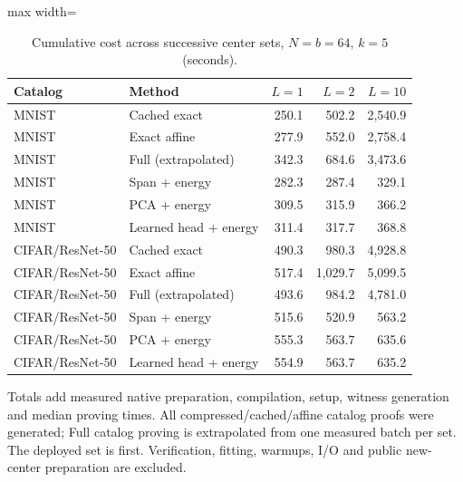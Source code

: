 \begin{table}[tp]
\caption{Cumulative cost across successive center sets, $N=b=64$, $k=5$ (seconds).}\label{tab:reuse-cost}
\centering\small
\begin{adjustbox}{max width=\textwidth}
\begin{tabular}{@{}llrrr@{}}
\toprule
Catalog & Method & $L=1$ & $L=2$ & $L=10$ \\
\midrule
MNIST & Cached exact & 250.1 & 502.2 & 2,540.9 \\
MNIST & Exact affine & 277.9 & 552.0 & 2,758.4 \\
MNIST & Full (extrapolated) & 342.3 & 684.6 & 3,473.6 \\
MNIST & Span + energy & 282.3 & 287.4 & 329.1 \\
MNIST & PCA + energy & 309.5 & 315.9 & 366.2 \\
MNIST & Learned head + energy & 311.4 & 317.7 & 368.8 \\
CIFAR/ResNet-50 & Cached exact & 490.3 & 980.3 & 4,928.8 \\
CIFAR/ResNet-50 & Exact affine & 517.4 & 1,029.7 & 5,099.5 \\
CIFAR/ResNet-50 & Full (extrapolated) & 493.6 & 984.2 & 4,781.0 \\
CIFAR/ResNet-50 & Span + energy & 515.6 & 520.9 & 563.2 \\
CIFAR/ResNet-50 & PCA + energy & 555.3 & 563.7 & 635.6 \\
CIFAR/ResNet-50 & Learned head + energy & 554.9 & 563.7 & 635.2 \\
\bottomrule
\end{tabular}
\end{adjustbox}
\par\smallskip\begin{minipage}{0.98\textwidth}\footnotesize Totals add measured native preparation, compilation, setup, witness generation and median proving times. All compressed/cached/affine catalog proofs were generated; Full catalog proving is extrapolated from one measured batch per set. The deployed set is first. Verification, fitting, warmups, I/O and public new-center preparation are excluded.\end{minipage}
\end{table}
